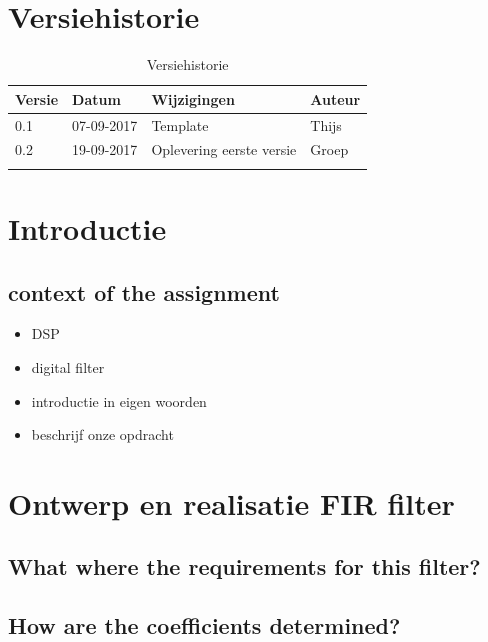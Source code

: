 \documentclass[11pt,a4paper]{article}
\begin{document}
	\section{Versiehistorie}
	\begin{table}[H]
		\centering
		\label{Versiehistorie}
		\begin{tabular}{|p{1cm}|p{2cm}|p{6cm}|p{2cm}|}
			\hline
			\rowcolor[HTML]{FFCC67}
			\textbf{Versie} & \textbf{Datum} & \textbf{Wijzigingen} & \textbf{Auteur} \\ \hline
			0.1    & 07-09-2017 & Template    & Thijs \\ \hline
			0.2	   & 19-09-2017 & Oplevering eerste versie  & Groep \\ \hline
			&       &             &        \\ \hline
		\end{tabular}
		\caption {Versiehistorie} \label{tab:title} 
	\end{table}	


	\section{Introductie}
		
		\subsection{context of the assignment}
			\begin{itemize}
				\item DSP
				\item digital filter
				\item introductie in eigen woorden
				\item beschrijf onze opdracht
			\end{itemize}
	
	\section{Ontwerp en realisatie FIR filter}
	
	\subsection{What where the requirements for this filter?}
	
	\subsection{How are the coefficients determined?}
	
\end{document}
